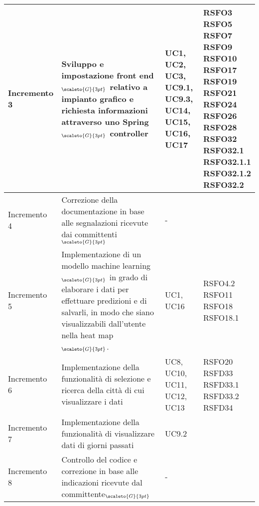 \begin{center}
\begin{longtable}[c]{p{3cm}|p{5cm}|p{4cm}|p{3cm}}
		\centering Incremento 3 & \centering Sviluppo e impostazione front end$_{\scaleto{G}{3pt}}$ relativo a impianto grafico e richiesta informazioni attraverso uno Spring$_{\scaleto{G}{3pt}}$ controller & \centering UC1, UC2, UC3, UC9.1, UC9.3, UC14, UC15, UC16, UC17 & \makecell[tc]{RSFO3 \\ RSFO5\\ RSFO7 \\  RSFO9 \\ RSFO10 \\ RSFO17 \\ RSFO19 \\ RSFO21 \\ RSFO24 \\ RSFO26 \\ RSFO28 \\ RSFO32 \\ RSFO32.1 \\ RSFO32.1.1 \\ RSFO32.1.2 \\ RSFO32.2} \\
		\hline
		\centering Incremento 4 & \centering Correzione della documentazione in base alle segnalazioni ricevute dai committenti$_{\scaleto{G}{3pt}}$ & \centering - & \makecell[tc]{-} \\
		\hline
		\centering Incremento 5 & \centering Implementazione di  un modello machine learning$_{\scaleto{G}{3pt}}$ in grado di elaborare i dati per effettuare predizioni e di salvarli, in modo che siano visualizzabili dall'utente nella heat map$_{\scaleto{G}{3pt}}$. & \centering UC1, UC16 & \makecell[tc]{RSFO4.2 \\ RSFO11 \\ RSFO18 \\	RSFO18.1} \\
		\hline
		\centering Incremento 6 & \centering Implementazione della funzionalità di selezione e ricerca
		della città di cui visualizzare i dati & \centering UC8, UC10, UC11, UC12, UC13 & \makecell[tc]{RSFO20 \\ RSFD33 \\ RSFD33.1 \\ RSFD33.2 \\ RSFD34} \\
		\hline
		\centering Incremento 7 & \centering Implementazione della funzionalità di visualizzare dati di giorni passati & \centering UC9.2 & \makecell[tc]{RSFO27} \\
		\hline
		\centering Incremento 8 & \centering Controllo del codice e correzione in base alle indicazioni ricevute dal committente$_{\scaleto{G}{3pt}}$ & \centering - & \makecell[tc]{-} \\

\end{longtable}
\end{center}
